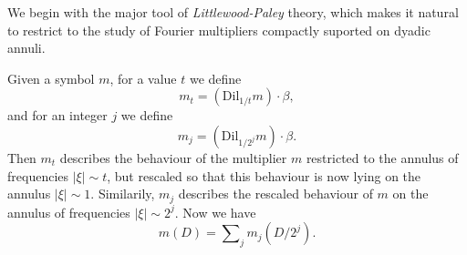 We begin with the major tool of \emph{Littlewood-Paley} theory, which makes it natural to restrict to the study of Fourier multipliers compactly suported on dyadic annuli.
\begin{comment}
    We can therefore introduce the Littlewood-Paley projection operators $P_j$, which are Fourier multipliers with symbol $\text{Dil}_{2^j} \phi$. Littlewood-Paley theory guarantees that for $1 < r < \infty$,
%
\[ \| f \|_{L^r(\RR^d)} \sim_r \left( \sum_n \| P_n f \|_{L^r(\RR^d)}^2 \right)^{1/2}. \]
%
We also must introduce a slightly thickened function $\tilde{\phi} \in C_c^\infty(\RR^d)$ supported on $\{ \xi \in \RR^d: 1/4 \leq |\xi| \leq 4 \}$, equal to one on the support of $\phi$, and with $1 = \sum_j \text{Dil}_{2^j} \tilde{\phi}$, then we can introuce the Littlewood-Paley projections $\tilde{P}_j$ with symbol $\text{Dil}_{2^j} \tilde{\phi}$. For $1 < q < \infty$, we thus have
%
\[ \| m(D) f \|_{L^q(\RR^d)} \sim_q \left( \sum_j \| P_j m(D) f \|_{L^q(\RR^d)}^2 \right)^{1/2} = \left( \| P_j m(D) \{ \tilde{P}_j f \} \|_{L^q(\RR^d)}^2 \right)^{1/2}. \]
%
Now
%
\[ P_j m(D) \{ \tilde{P}_j f \} = \text{Dil}_{1/2^j} \{ m_{2^j}(D) \circ \text{Dil}_{2^j} \{ \tilde{P}_j f \} \}, \]
%
and so
%
\[ \| P_j m(D) \{ \tilde{P}_j f \} \|_{L^q(\RR^d)} = 2^{-jd/q} \| m_{2^j}(D) \text{Dil}_{2^j} \{ \tilde{P}_j f \} \|_{L^q(\RR^d)}. \]
%
We thus have
%
\begin{align*}
    \| m(D) f \|_{L^q(\RR^d)} &\lesssim_q \left( \sum_j 4^{jd(1/p - 1/q)} \| m_{2^j} \|_{M^{p,q}(\RR^d)}^2 \| \tilde{P}_j f \|_{L^p(\RR^d)}^2 \right)^{1/2}\\
    &\leq \left( \sup_t t^{d(1/p - 1/q)} \| m_t \|_{M^{p,q}(\RR^d)} \right) \left( \sum_j \| \tilde{P}_j f \|_{L^p(\RR^d)}^2 \right)^{1/2}\\
    &\sim_p \left( \sup_t t^{d(1/p - 1/q)} \| m_t \|_{M^{p,q}(\RR^d)} \right) \| f \|_{L^p(\RR^d)}.
\end{align*}
%
Moreover, this inequality is tight.
\end{comment}
Given a symbol $m$, for a value $t$ we define
%
\[ m_t = (\text{Dil}_{1/t} m) \cdot \beta, \]
%
and for an integer $j$ we define
%
\[ m_j = (\text{Dil}_{1/2^j} m) \cdot \beta. \]
%
Then $m_t$ describes the behaviour of the multiplier $m$ restricted to the annulus of frequencies $|\xi| \sim t$, but rescaled so that this behaviour is now lying on the annulus $|\xi| \sim 1$. Similarily, $m_j$ describes the rescaled behaviour of $m$ on the annulus of frequencies $|\xi| \sim 2^j$. Now we have
%
\[ m(D) = \sum\nolimits_j m_j(D / 2^j). \]
%
